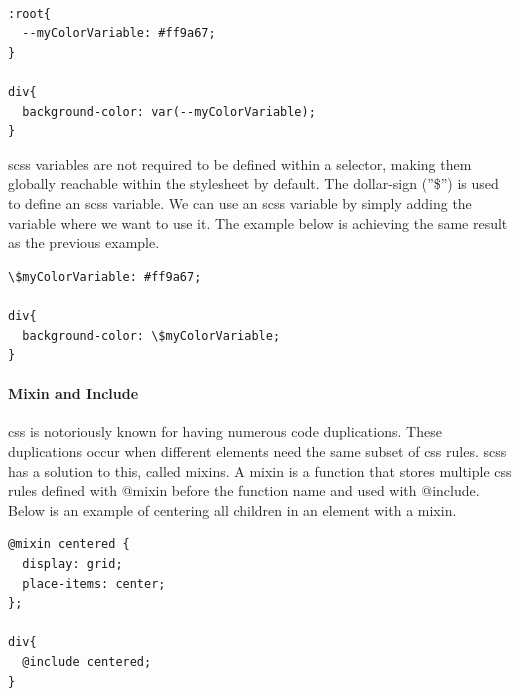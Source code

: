 \begin{lstlisting}[style=htmlcssjs]

:root{
  --myColorVariable: #ff9a67; 
}

div{
  background-color: var(--myColorVariable);
}
\end{lstlisting}


\acrshort{scss} variables are not required to be defined within a selector, making them globally reachable within the stylesheet by default. The dollar-sign (''\$'') is used to define an \acrshort{scss} variable. We can use an \acrshort{scss} variable by simply adding the variable where we want to use it. The example below is achieving the same result as the previous example.


\begin{lstlisting}[style=htmlcssjs]
\$myColorVariable: #ff9a67; 

div{
  background-color: \$myColorVariable;
}
\end{lstlisting}


\paragraph{Mixin and Include}
\acrshort{css} is notoriously known for having numerous code duplications. These duplications occur when different elements need the same subset of \acrshort{css} rules. \acrshort{scss} has a solution to this, called \glspl{mixin}. A \gls{mixin} is a function that stores multiple \acrshort{css} rules defined with @mixin before the function name and used with @include. Below is an example of centering all children in an element with a \gls{mixin}. 

\begin{lstlisting}[style=htmlcssjs]
@mixin centered {
  display: grid;
  place-items: center;
}; 

div{
  @include centered; 
}
\end{lstlisting}




